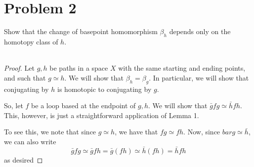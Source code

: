 \documentclass[fontsize=11pt]{scrartcl} %
\numberwithin{equation}{section} %
\numberwithin{figure}{section} %
\numberwithin{table}{section} %
\begin{document}
\section*{Problem 2}
Show that the change of basepoint homomorphism $\beta_h$ depends only on the
homotopy class of $h$.
\\
\\
\begin{proof}
    Let $g,h$ be paths in a space $X$ with the same starting and ending points,
    and such that $g\simeq h$. We will show that $\beta_h=\beta_g$. In
    particular, we will show that conjugating by $h$ is homotopic to conjugating
    by $g$.

    So, let $f$ be a loop based at the endpoint of $g,h$. We will show that
    $\bar{g}fg \simeq \bar{h}fh$. This, however, is just a straightforward
    application of Lemma 1.
    
    To see this, we note that since $g\simeq h$, we have that $fg\simeq fh$.
    Now, since $bar{g}\simeq \bar{h}$, we can also write
    \[
        \bar{g}fg\simeq \bar{g}fh = \bar{g}(fh)\simeq \bar{h}(fh) = \bar{h}fh
    \]
    as desired
\end{proof}
\end{document}
